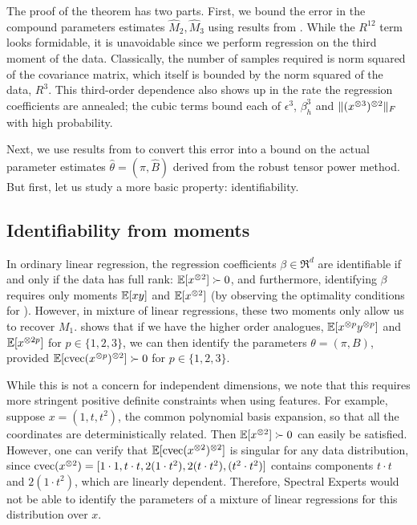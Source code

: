 The proof of the theorem has two parts.
First, we bound the error in the compound parameters estimates $\hat M_2,\hat M_3$
using results from \citet{Tomioka2011}.
While the $R^{12}$ term looks formidable, it is unavoidable since we
perform regression on the third moment of the data. Classically, the
number of samples required is norm squared of the covariance matrix,
which itself is bounded by the norm squared of the data, $R^3$. This
third-order dependence also shows up in the rate the regression
coefficients are annealed; the cubic terms bound each of $\epsilon^3$,
$\beta_h^3$ and $\|(x^{\otimes 3})^{\otimes 2}\|_F$ with high probability. 

Next, we use results from \citet{AnandkumarGeHsu2012} to convert this error
into a bound on the actual parameter estimates $\hat\theta = (\hat\pi, \hat B)$
derived from the robust tensor power method.
But first, let us study a more basic property: identifiability.


\subsection{Identifiability from moments}

In ordinary linear regression, the regression coefficients $\beta \in
\Re^d$ are identifiable if and only if the data has full rank:
$\operatorname{\mathbb{E}}[x^{\otimes 2}] \succ 0$, and furthermore, identifying $\beta$ requires
only moments $\operatorname{\mathbb{E}}[xy]$ and $\operatorname{\mathbb{E}}[x^{\otimes 2}]$ (by observing the optimality
conditions for ).  However, in mixture of linear regressions,
these two moments only allow us to recover $M_1$.  
shows that if we have the higher order analogues, $\operatorname{\mathbb{E}}[x^{\otimes p}y^{\otimes p}]$
and $\operatorname{\mathbb{E}}[x^{\otimes 2p}]$ for $p \in \{1,2,3\}$, we can then identify the
parameters $\theta = (\pi, B)$, provided $\operatorname{\mathbb{E}}[\operatorname{cvec}(x^{\otimes p})^{\otimes 2}] \succ
0$ for $p \in \{1,2,3\}$.

While this is not a concern for independent dimensions, we note that
this requires more stringent positive definite constraints when using
features. For example, suppose $x = (1, t, t^2)$, the common polynomial
basis expansion, so that all the coordinates are deterministically
related.  Then $\operatorname{\mathbb{E}}[x^{\otimes 2}] \succ 0$ can easily be satisfied. 
However, one can verify that $\operatorname{\mathbb{E}}[\operatorname{cvec}(x^{\otimes 2})^{\otimes 2}]$ is singular for
any data distribution, since $\operatorname{cvec}(x^{\otimes 2}) = [1 \cdot 1, t\cdot t, 2(1
\cdot t^2), 2(t \cdot t^2), (t^2 \cdot t^2)]$ contains components $t
\cdot t$ and $2(1 \cdot t^2)$, which are linearly dependent.  Therefore,
Spectral Experts would not be able to identify the parameters of
a mixture of linear regressions for this distribution over $x$.

